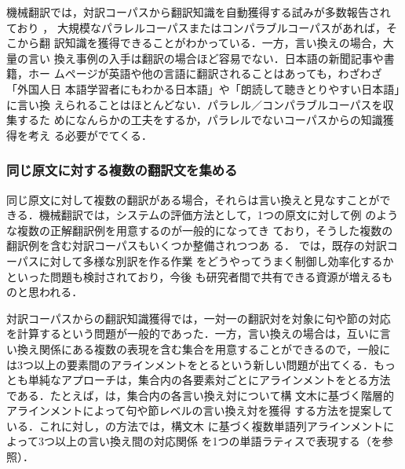 機械翻訳では，対訳コーパスから翻訳知識を自動獲得する試みが多数報告され
ており
\cite{meyers:98,watanabe:00,melamed:01,YamamotoKaoru:01:b,imamura:02}，
大規模なパラレルコーパスまたはコンパラブルコーパスがあれば，そこから翻
訳知識を獲得できることがわかっている．一方，言い換えの場合，大量の言い
換え事例の入手は翻訳の場合ほど容易でない．日本語の新聞記事や書籍，ホー
ムページが英語や他の言語に翻訳されることはあっても，わざわざ「外国人日
本語学習者にもわかる日本語」や「朗読して聴きとりやすい日本語」に言い換
えられることはほとんどない．パラレル／コンパラブルコーパスを収集するた
めになんらかの工夫をするか，パラレルでないコーパスからの知識獲得を考え
る必要がでてくる．

\subsubsection{同じ原文に対する複数の翻訳文を集める}

同じ原文に対して複数の翻訳がある場合，それらは言い換えと見なすことがで
きる．機械翻訳では，システムの評価方法として，1つの原文に対して例
のような複数の正解翻訳例を用意するのが一般的になってき
ており，そうした複数の翻訳例を含む対訳コーパスもいくつか整備されつつあ
る\cite{shirai:01:c,shimohata:04:b}．
\cite{shirai:01:c}では，既存の対訳コーパスに対して多様な別訳を作る作業
をどうやってうまく制御し効率化するかといった問題も検討されており，今後
も研究者間で共有できる資源が増えるものと思われる．

対訳コーパスからの翻訳知識獲得では，一対一の翻訳対を対象に句や節の対応
を計算するという問題が一般的であった．一方，言い換えの場合は，互いに言
い換え関係にある複数の表現を含む集合を用意することができるので，一般に
は3つ以上の要素間のアラインメントをとるという新しい問題が出てくる．もっ
とも単純なアプローチは，集合内の各要素対ごとにアラインメントをとる方法
である．たとえば，は，集合内の各言い換え対について構
文木に基づく階層的アラインメントによって句や節レベルの言い換え対を獲得
する方法を提案している．これに対し，の方法では，構文木
に基づく複数単語列アラインメントによって3つ以上の言い換え間の対応関係
を1つの単語ラティスで表現する（を参照）．

